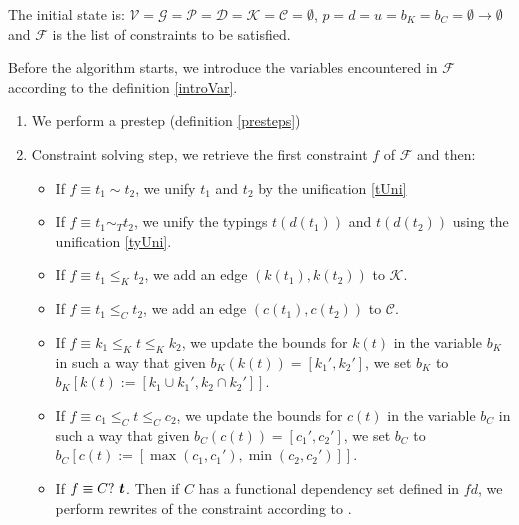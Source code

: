 \begin{defn}
    The initial state is: $\mathcal{V} = \mathcal{G} = \mathcal{P} = \mathcal{D} = \mathcal{K} = \mathcal{C} = \emptyset$, $p = d = u = b_K = b_C = \emptyset \to \emptyset$ and $\mathcal{F}$ is the list of constraints to be satisfied.

    Before the algorithm starts, we introduce the variables encountered in $\mathcal{F}$ according to the definition \ref{introVar}.
\end{defn}

\begin{defn}

    \begin{enumerate}
        \item We perform a prestep (definition \ref{presteps}) \label{prestep_step}

        \item Constraint solving step, we retrieve the first constraint $f$ of $\mathcal{F}$ and then:

        \begin{itemize}
            \item If $f \equiv t_1 \sim t_2$, we unify $t_1$ and $t_2$ by the unification \ref{tUni}

            \item If $f \equiv t_1 \sim_T t_2$, we unify the typings $t (d (t_1))$ and $t (d (t_2))$ using the unification \ref{tyUni}.

            \item If $f \equiv t_1 \leq_K t_2$, we add an edge $(k(t_1), k(t_2))$ to $\mathcal{K}$.

            \item If $f \equiv t_1 \leq_C t_2$, we add an edge $(c(t_1), c(t_2))$ to $\mathcal{C}$.

            \item If $f \equiv k_1 \leq_K t \leq_K k_2$, we update the bounds for $k(t)$ in the variable $b_K$ in such a way that given $b_K(k(t)) = [k_1', k_2']$, we set $b_K$ to $b_K[ k(t) := [k_1 \cup k_1', k_2 \cap k_2'] ]$.

            \item If $f \equiv c_1 \leq_C t \leq_C c_2$, we update the bounds for $c(t)$ in the variable $b_C$ in such a way that given $b_C(c(t)) = [c_1', c_2']$, we set $b_C$ to $b_C[ c(t) := [\max (c_1, c_1'), \min (c_2,  c_2')] ]$.

            \item If $f \equiv C?\ \boldsymbol{t}$. Then if $C$ has a functional dependency set defined in $fd$, we perform rewrites of the constraint according to .


\end{itemize}
\end{enumerate}
\end{defn}
